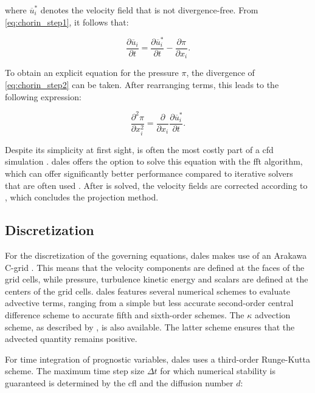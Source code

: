 where $\overline{u}^*_i$ denotes the velocity field that is not divergence-free. From \autoref{eq:chorin_step1}, it follows that:

\begin{equation}
    \frac{\partial \overline{u}_i}{\partial t} = \frac{\partial \overline{u}^*_i}{\partial t} - \frac{\partial \pi}{\partial x_i}. \label{eq:chorin_step2}
\end{equation}

To obtain an explicit equation for the pressure $\pi$, the divergence of \autoref{eq:chorin_step2} can be taken. After rearranging terms, this leads to the following expression:

\begin{equation}
    \frac{\partial^2 \pi}{\partial x_i^2} = \frac{\partial}{\partial x_i} \frac{\partial \overline{u}_i^*}{\partial t}. \label{eq:poisson_equation}
\end{equation}

Despite its simplicity at first sight,  is often the most costly part of a \acrshort{cfd} simulation \citep{costaFFTbasedFinitedifferenceSolver2018}. \acrshort{dales} offers the option to solve this equation with the \acrfull{fft} algorithm, which can offer significantly better performance compared to iterative solvers that are often used \citep{hockneyFastDirectSolution1965}. After  is solved, the velocity fields are corrected according to , which concludes the projection method.

\subsection{Discretization}
For the discretization of the governing equations, \acrshort{dales} makes use of an Arakawa C-grid \citep{arakawaComputationalDesignBasic1977}. This means that the velocity components are defined at the faces of the grid cells, while pressure, turbulence kinetic energy and scalars are defined at the centers of the grid cells. \acrshort{dales} features several numerical schemes to evaluate advective terms, ranging from a simple but less accurate second-order central difference scheme to accurate fifth and sixth-order schemes. The $\kappa$ advection scheme, as described by \citet{hundsdorferPositiveFiniteDifferenceAdvection1995}, is also available. The latter scheme ensures that the advected quantity remains positive.

For time integration of prognostic variables, \acrshort{dales} uses a third-order Runge-Kutta scheme. The maximum time step size $\Delta t$ for which numerical stability is guaranteed is determined by the \acrfull{cfl} and the diffusion number $d$:

